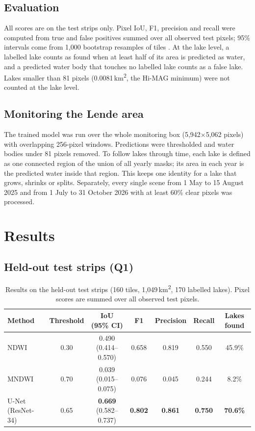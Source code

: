 \documentclass[11pt,a4paper]{article}
\newcommand{\kmsq}{\,km\textsuperscript{2}}
\begin{document}
\subsection{Evaluation}
All scores are on the test strips only. Pixel IoU, F1, precision and recall were computed from true and false positives summed over all observed test pixels; 95\% intervals come from 1,000 bootstrap resamples of tiles \cite{efron1993}. At the lake level, a labelled lake counts as found when at least half of its area is predicted as water, and a predicted water body that touches no labelled lake counts as a false lake. Lakes smaller than 81 pixels (0.0081\kmsq, the Hi-MAG minimum) were not counted at the lake level.

\subsection{Monitoring the Lende area}
The trained model was run over the whole monitoring box (5,942$\times$5,062 pixels) with overlapping 256-pixel windows. Predictions were thresholded and water bodies under 81 pixels removed. To follow lakes through time, each lake is defined as one connected region of the union of all yearly masks; its area in each year is the predicted water inside that region. This keeps one identity for a lake that grows, shrinks or splits. Separately, every single scene from 1 May to 15 August 2025 and from 1 July to 31 October 2026 with at least 60\% clear pixels was processed.

\section{Results}

\subsection{Held-out test strips (Q1)}

\begin{table}[H]
\centering\small
\caption{Results on the held-out test strips (160 tiles, 1,049\kmsq, 170 labelled lakes). Pixel scores are summed over all observed test pixels.}
\label{tab:main}
\begin{tabularx}{\textwidth}{@{}l c c c c c c@{}}
\toprule
Method & Threshold & IoU (95\% CI) & F1 & Precision & Recall & Lakes found \\
\midrule
NDWI & 0.30 & 0.490 (0.414--0.570) & 0.658 & 0.819 & 0.550 & 45.9\% \\
MNDWI & 0.70 & 0.039 (0.015--0.075) & 0.076 & 0.045 & 0.244 & 8.2\% \\
U-Net (ResNet-34) & 0.65 & \textbf{0.669} (0.582--0.737) & \textbf{0.802} & \textbf{0.861} & \textbf{0.750} & \textbf{70.6\%} \\
\bottomrule
\end{tabularx}
\end{table}
\end{document}
